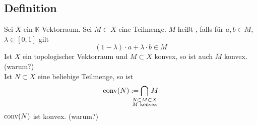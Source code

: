 \subsection[Definition: Konvexe Teilmenge eines $\mathds{K}$-Vektorraums]{Definition} %
\label{sub:225}
Sei $X$ ein $\mathds{K}$-Vektorraum. Sei $M \subset X$ eine Teilmenge. $M$ heißt , falls für $a,b \in M$, $\lambda \in [0,1]$ gilt
\[
	(1-\lambda ) \cdot a + \lambda \cdot b \in M
\]
Ist $X$ ein topologischer Vektorraum und $M \subset X$ konvex, so ist auch $\overline{M}$ konvex. \hfill (warum?)\\
Ist $N \subset X$ eine beliebige Teilmenge, so ist 
\[
	\conv(N) := \smashoperator{\bigcap_{\substack{N \subset M \subset X \\ M \text{ konvex} }}} \, M
\]
$\operatorname{conv}(N)$ ist konvex. (warum?)

